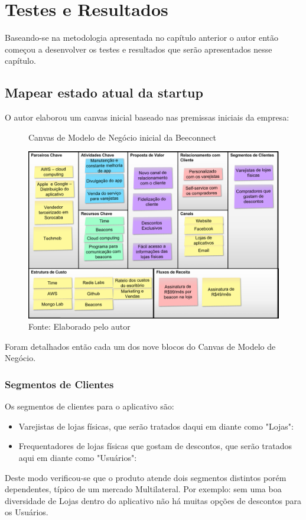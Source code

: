 \chapter{Testes e Resultados}
\label{cha:testes_e_resultados}
Baseando-se na metodologia apresentada no capítulo anterior o autor então começou a desenvolver os testes e resultados que serão apresentados nesse capítulo.

\section{Mapear estado atual da startup}
\label{cha:mapear_estado}
O autor elaborou um canvas inicial baseado nas premissas iniciais da empresa: 

\begin{figure}[H]
\caption{Canvas de Modelo de Negócio inicial da Beeconnect}
\centerline{\includegraphics[scale=0.25]{img/canvas_beeconnect_1}}
\label{fig:canvas_beeconnect_1}
\caption* {Fonte: Elaborado pelo autor}
\end{figure}

Foram detalhados então cada um dos nove blocos do Canvas de Modelo de Negócio.
\subsection{Segmentos de Clientes}
\label{cha:segmentos_de_clientes}
Os segmentos de clientes para o aplicativo são:
\begin{itemize}
\item Varejistas de lojas físicas, que serão tratados daqui em diante como "Lojas": 
\item Frequentadores de lojas físicas que gostam de descontos, que serão tratados aqui em diante como "Usuários": 
\end{itemize}
Deste modo verificou-se que o produto atende dois segmentos distintos porém dependentes, típico de um mercado Multilateral. Por exemplo: sem uma boa diversidade de Lojas dentro do aplicativo não há muitas opções de descontos para os Usuários.


